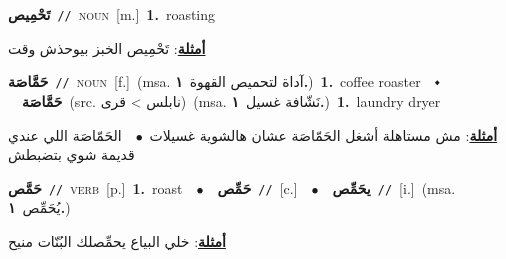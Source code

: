 \documentclass[10pt,a4paper,twoside]{article} %
\begin{document}
\begin{multicols}{2}
{\setlength\topsep{0pt}\textbf{\foreignlanguage{arabic}{تَحْمِيص}}\ {\color{gray}\texttt{//}\color{black}}\ \textsc{noun}\ [m.]\ \textbf{1.}~roasting\  \begin{flushright}\color{gray}\foreignlanguage{arabic}{\textbf{\underline{\foreignlanguage{arabic}{أمثلة}}}: تَحْمِيص الخبز بيوحذش وقت}\end{flushright}\color{black}} \vspace{2mm}

{\setlength\topsep{0pt}\textbf{\foreignlanguage{arabic}{حَمَّاصَة}}\ {\color{gray}\texttt{//}\color{black}}\ \textsc{noun}\ [f.]\ \color{gray}(msa. \foreignlanguage{arabic}{آداة لتحميص القهوة}~\foreignlanguage{arabic}{\textbf{١.}})\color{black}\ \textbf{1.}~coffee roaster\ \ $\smblkdiamond$\ \ \setlength\topsep{0pt}\textbf{\foreignlanguage{arabic}{حَمَّاصَة}}\ (src. \color{gray}\foreignlanguage{arabic}{نابلس > قرى}\color{black})\ \color{gray}(msa. \foreignlanguage{arabic}{نَشّافة غسيل}~\foreignlanguage{arabic}{\textbf{١.}})\color{black}\ \textbf{1.}~laundry dryer\  \begin{flushright}\color{gray}\foreignlanguage{arabic}{\textbf{\underline{\foreignlanguage{arabic}{أمثلة}}}: مش مستاهلة أشغل الحَمّاصَة عشان هالشوية غسيلات\ $\bullet$\ \  الحَمّاصَة اللي عندي قديمة شوي بتضبطش}\end{flushright}\color{black}} \vspace{2mm}

{\setlength\topsep{0pt}\textbf{\foreignlanguage{arabic}{حَمَّص}}\ {\color{gray}\texttt{//}\color{black}}\ \textsc{verb}\ [p.]\ \textbf{1.}~roast\ \ $\bullet$\ \ \setlength\topsep{0pt}\textbf{\foreignlanguage{arabic}{حَمِّص}}\ {\color{gray}\texttt{//}\color{black}}\ [c.]\ \ $\bullet$\ \ \setlength\topsep{0pt}\textbf{\foreignlanguage{arabic}{يحَمِّص}}\ {\color{gray}\texttt{//}\color{black}}\ [i.]\ \color{gray}(msa. \foreignlanguage{arabic}{يُحَمِّص}~\foreignlanguage{arabic}{\textbf{١.}})\color{black}\  \begin{flushright}\color{gray}\foreignlanguage{arabic}{\textbf{\underline{\foreignlanguage{arabic}{أمثلة}}}: خلي البياع يحمِّصلك البُنّات منيح}\end{flushright}\color{black}} \vspace{2mm}


\end{multicols}
\end{document}

